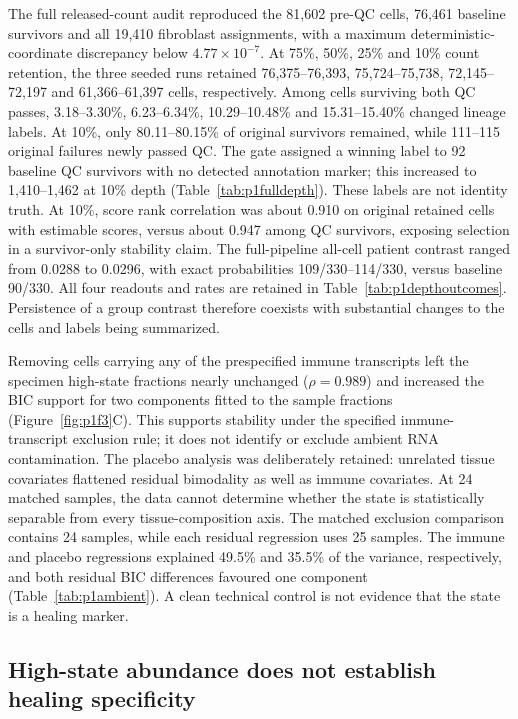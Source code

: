 The full released-count audit reproduced the 81,602 pre-QC cells, 76,461 baseline survivors and all 19,410 fibroblast assignments, with a maximum deterministic-coordinate discrepancy below $4.77\times10^{-7}$. At 75\%, 50\%, 25\% and 10\% count retention, the three seeded runs retained 76,375--76,393, 75,724--75,738, 72,145--72,197 and 61,366--61,397 cells, respectively. Among cells surviving both QC passes, 3.18--3.30\%, 6.23--6.34\%, 10.29--10.48\% and 15.31--15.40\% changed lineage labels. At 10\%, only 80.11--80.15\% of original survivors remained, while 111--115 original failures newly passed QC. The gate assigned a winning label to 92 baseline QC survivors with no detected annotation marker; this increased to 1,410--1,462 at 10\% depth (Table~\ref{tab:p1fulldepth}). These labels are not identity truth. At 10\%, score rank correlation was about 0.910 on original retained cells with estimable scores, versus about 0.947 among QC survivors, exposing selection in a survivor-only stability claim. The full-pipeline all-cell patient contrast ranged from 0.0288 to 0.0296, with exact probabilities 109/330--114/330, versus baseline 90/330. All four readouts and rates are retained in Table~\ref{tab:p1depthoutcomes}. Persistence of a group contrast therefore coexists with substantial changes to the cells and labels being summarized.

Removing cells carrying any of the prespecified immune transcripts left the specimen high-state fractions nearly unchanged ($\rho=0.989$) and increased the BIC support for two components fitted to the sample fractions (Figure~\ref{fig:p1f3}C). This supports stability under the specified immune-transcript exclusion rule; it does not identify or exclude ambient RNA contamination. The placebo analysis was deliberately retained: unrelated tissue covariates flattened residual bimodality as well as immune covariates. At 24 matched samples, the data cannot determine whether the state is statistically separable from every tissue-composition axis. The matched exclusion comparison contains 24 samples, while each residual regression uses 25 samples. The immune and placebo regressions explained 49.5\% and 35.5\% of the variance, respectively, and both residual BIC differences favoured one component (Table~\ref{tab:p1ambient}). A clean technical control is not evidence that the state is a healing marker.

\subsection{High-state abundance does not establish healing specificity}

